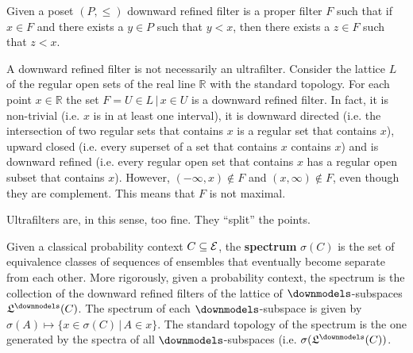 \begin{mathSection}
	\begin{defn}
		Given a poset $(P, \leq)$ downward refined filter is a proper filter $F$ such that if $x \in F$ and there exists a $y \in P$ such that $y < x$, then there exists a $z \in F$ such that $z < x$.
	\end{defn}
	
	\begin{remark}
		A downward refined filter is not necessarily an ultrafilter. Consider the lattice $L$ of the regular open sets of the real line $\mathbb{R}$ with the standard topology. For each point $x \in \mathbb{R}$ the set $F = {U \in L \, | \, x \in U}$ is a downward refined filter. In fact, it is non-trivial (i.e. $x$ is in at least one interval), it is downward directed (i.e. the intersection of two regular sets that contains $x$ is a regular set that contains $x$), upward closed (i.e. every superset of a set that contains $x$ contains $x$) and is downward refined (i.e. every regular open set that contains $x$ has a regular open subset that contains $x$). However, $(-\infty, x) \notin F$ and $(x, \infty) \notin F$, even though they are complement. This means that $F$ is not maximal.
		
		Ultrafilters are, in this sense, too fine. They ``split'' the points.
	\end{remark}
	
	\begin{defn}
		Given a classical probability context $C \subseteq \mathcal{E}$, the \textbf{spectrum} $\sigma(C)$ is the set of equivalence classes of sequences of ensembles that eventually become separate from each other. More rigorously, given a probability context, the spectrum is the collection of the downward refined filters of the lattice of $\separate$-subspaces $\mathfrak{L}^\separate(C)$. The spectrum of each $\separate$-subspace is given by $\sigma(A) \mapsto \{ x \in \sigma(C) \, | \, A \in x \}$. The standard topology of the spectrum is the one generated by the spectra of all $\separate$-subspaces (i.e. $\sigma(\mathfrak{L}^\separate(C))$.
	\end{defn}
	

\end{mathSection}
